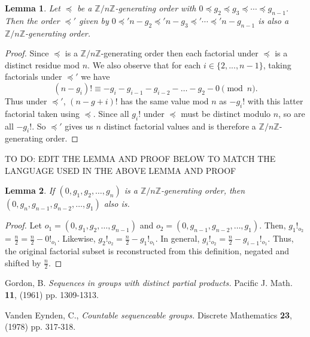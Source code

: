 \documentclass{article}
\newcommand{\ZZ}{\mathbb{Z}}
\newcommand{\ZnZ}{\ZZ/n\ZZ}
\newtheorem{lemma}{Lemma}
\begin{document}
\begin{lemma}
Let $\preceq$ be a $\ZnZ$-generating order with $0\preceq g_2\preceq g_3\preceq\cdots\preceq g_{n-1}$. Then the order $\preceq'$ given by $0\preceq' n-g_2\preceq' n-g_3\preceq'\cdots\preceq' n-g_{n-1}$ is also a $\ZnZ$-generating order.
\end{lemma}
\begin{proof} Since $\preceq$ is a $\ZnZ$-generating order then each factorial under $\preceq$ is a distinct residue mod $n$. We also observe that for each $i\in\{2,...,n-1\}$, taking factorials under $\preceq'$ we have
\[(n-g_i)! \equiv -g_i - g_{i-1} - g_{i-2} - \ldots - g_2-0 \pmod{n}.\]  
Thus under $\preceq'$, $(n-g+i)!$ has the same value mod $n$ as $-g_i!$ with this latter factorial taken using $\preceq$. Since all $g_i!$ under $\preceq$ must be distinct modulo $n$, so are all $-g_i!$. So $\preceq'$ gives us $n$ distinct factorial values and is therefore a $\ZnZ$-generating order.
\end{proof}



TO DO: EDIT THE LEMMA AND PROOF BELOW TO MATCH THE LANGUAGE USED IN THE ABOVE LEMMA AND PROOF
\begin{lemma}
If $(0, g_1, g_2, \ldots, g_n)$ is a $\ZnZ$-generating order, then $(0, g_n, g_{n-1}, g_{n-2}, \ldots, g_1)$ also is.
\end{lemma}
\begin{proof}
Let $o_1 = (0,g_1, g_2, \ldots, g_{n-1})$ and $o_2 = (0, g_{n-1}, g_{n-2}, \ldots, g_1)$. Then, $g_1!_{o_2}$ = $\frac{n}{2} = \frac{n}{2} - 0!_{o_1}$. Likewise, $g_2!_{o_2} = \frac{n}{2}-g_1!_{o_1}$. In general, $g_i!_{o_2} = \frac{n}{2} - g_{i-1}!_{o_1}$. Thus, the original factorial subset is reconstructed from this definition, negated and shifted by $\frac{n}{2}$.  
\end{proof}


\begin{thebibliography}{}

 Gordon, B. {\em Sequences in groups with distinct partial products.} Pacific J. Math. \textbf{11}, (1961) pp. 1309-1313.

 Vanden Eynden, C., {\em Countable sequenceable groups.} Discrete Mathematics \textbf{23}, (1978) pp. 317-318.

\end{thebibliography}
\end{document}
